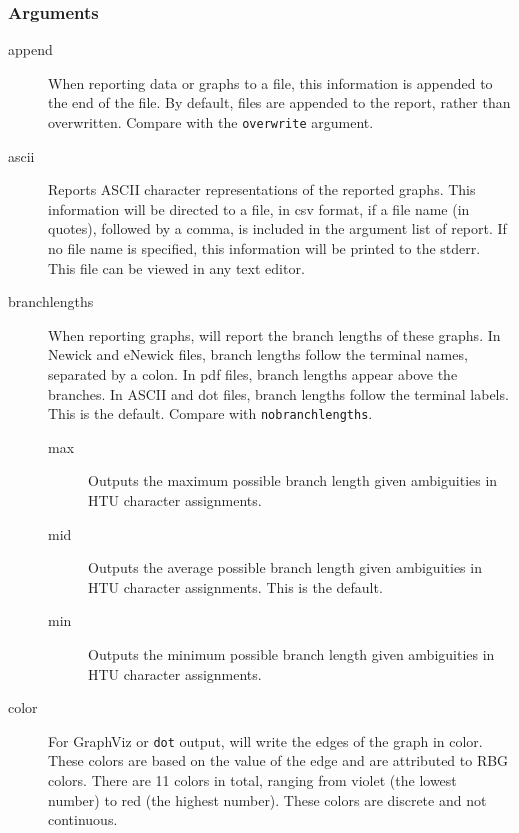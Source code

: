 	\subsubsection{Arguments}
	\begin{description}
		
		\item[append] When reporting data or graphs to a file, this information is 
		appended to the end of the file. By default, files are appended to the report, 
		rather than overwritten. Compare with the \texttt{overwrite} argument.

		\item[ascii] Reports ASCII character representations of the reported graphs.
		This information will be directed to a file, in csv format, if a file name (in quotes), 
		followed by a comma, is included in the argument list of report. If no file name is 
		specified, this information will be printed to the stderr. This file can be viewed 
		in any text editor. 
		
		\item[branchlengths] When reporting graphs, \phyg will report the branch 
		lengths of these graphs. In Newick and eNewick files, branch lengths 
		follow the terminal names, separated by a colon. In pdf files, branch 
		lengths appear above the branches. In ASCII and dot files, branch 
		lengths follow the terminal labels. This is the default. Compare with 
		\texttt{nobranchlengths}. 
		
			\begin{description}
			
			\item[max] Outputs the maximum possible branch length given ambiguities
			in HTU character assignments.
			
			\item[mid] Outputs the average possible branch length given ambiguities
			in HTU character assignments. This is the default.
			
			\item[min] Outputs the minimum possible branch length given ambiguities
			in HTU character assignments. 
			
			\end{description}
		
		\item[color] For GraphViz or \texttt{dot} output, \phyg will write the edges of 
		the graph in color. These colors are based on the value of the edge and are
		attributed to RBG colors. There are 11 colors in total, ranging from violet (the 
		lowest number) to red (the highest number). These colors are discrete and not 
		continuous.


\end{description}
